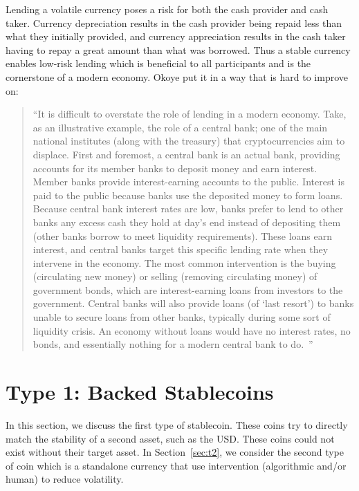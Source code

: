 Lending a volatile currency poses a risk for both the cash provider and cash taker. Currency depreciation results in the cash provider being repaid less than what they initially provided, and currency appreciation results in the cash taker having to repay a great amount than what was borrowed. Thus a stable currency enables low-risk lending which is beneficial to all participants and is the cornerstone of a modern economy. Okoye \etal put it in a way that is hard to improve on:

\begin{quote}

``It is difficult to overstate the role of lending in a modern economy. Take, as an illustrative example, the role of a central bank; one of the main national institutes (along with the treasury) that cryptocurrencies aim to displace. First and foremost, a central bank is an actual bank, providing accounts for its member banks to deposit money and earn interest. Member banks provide interest-earning accounts to the public. Interest is paid to the public because banks use the deposited money to form loans. Because central bank interest rates are low, banks prefer to lend to other banks any excess cash they hold at day's end instead of depositing them (other banks borrow to meet liquidity requirements). These loans earn interest, and central banks target this specific lending rate when they intervene in the economy. The most common intervention is the buying (circulating new money) or selling (removing circulating money) of government bonds, which are interest-earning loans from investors to the government. Central banks will also provide loans (of `last resort') to banks unable to secure loans from other banks, typically during some sort of liquidity crisis. An economy without loans would have no interest rates, no bonds, and essentially nothing for a modern central bank to do.~\cite{okoyetoward}''

\end{quote}







\section{Type 1: Backed Stablecoins}
\label{sec:t1}

In this section, we discuss the first type of stablecoin. These coins try to directly match the stability of a second asset, such as the USD. These coins could not exist without their target asset. In Section~\ref{sec:t2}, we consider the second type of coin which is a standalone currency that use intervention (algorithmic and/or human) to reduce volatility.

